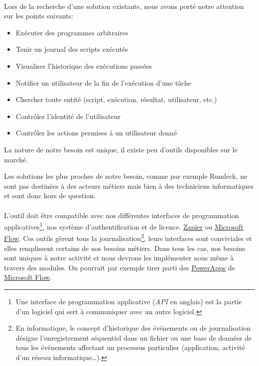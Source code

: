 \paragraph{}
Lors de la recherche d'une solution existante, nous avons porté notre attention sur les points suivants:
\begin{itemize}
    \item Exécuter des programmes arbitraires
    \item Tenir un journal des scripts exécutés
    \item Visualiser l'historique des exécutions passées
    \item Notifier un utilisateur de la fin de l'exécution d'une tâche
    \item Chercher toute entité (script, exécution, résultat, utilisateur, etc.)
    \item Contrôler l'identité de l'utilisateur
    \item Contrôler les actions permises à un utilisateur donné
\end{itemize}
La nature de notre besoin est unique, il existe peu d'outils disponibles sur le marché.

Les solutions les plus proches de notre besoin, comme par exemple Rundeck, ne sont pas destinées à des acteurs métiers mais bien à des techniciens informatiques et sont donc hors de question.

\paragraph{}
L'outil doit être compatible avec nos différentes interfaces de programmation applicatives\footnote{Une interface de programmation applicative (\textit{API} en anglais) est la partie d'un logiciel qui sert à communiquer avec un autre logiciel.}, nos système d'authentification et de licence.
\href{https://zapier.com/}{Zapier} ou
\href{https://flow.microsoft.com/fr-fr/}{Microsoft Flow}.
Ces outils gèrent tous la journalisation\footnote{En informatique, le concept d'historique des événements ou de journalisation désigne l'enregistrement séquentiel dans un fichier ou une base de données de tous les événements affectant un processus particulier (application, activité d'un réseau informatique…)\cite{wikipedia_historique_2018}.}, leurs interfaces sont conviviales et elles remplissent certains de nos besoins métiers.
Dans tous les cas, nos besoins sont uniques à notre activité et nous devrons les implémenter nous même à travers des modules.
On pourrait par exemple tirer parti des \href{https://powerapps.microsoft.com/fr-fr/}{PowerApps} de \href{https://flow.microsoft.com/fr-fr/}{Microsoft Flow}.

